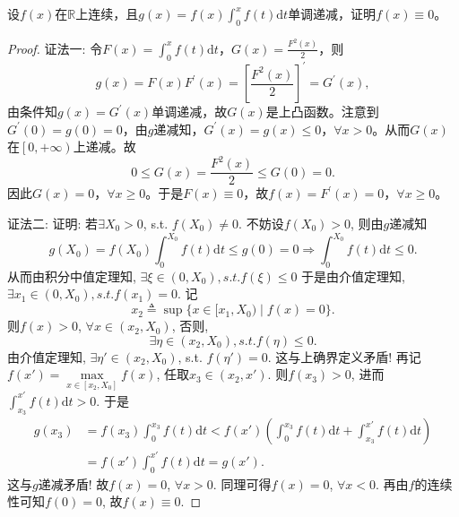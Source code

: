 \documentclass[../../main.tex]{subfiles}
\begin{document}
\begin{example}
设$f(x)$在$\mathbb{R}$上连续，且$g(x)=f(x)\int_0^x f(t)\mathrm{d}t$单调递减，证明$f(x)\equiv 0$。
\end{example}
\begin{proof}
{\color{blue}证法一:}
令$F\left( x \right) =\int_0^x{f\left( t \right) \mathrm{d}t}$，$G\left( x \right) =\frac{F^2\left( x \right)}{2}$，则
\[
g\left( x \right) =F\left( x \right) F^\prime \left( x \right) =\left[ \frac{F^2\left( x \right)}{2} \right] ^\prime =G^\prime \left( x \right),
\]
由条件知$g\left( x \right) =G^\prime \left( x \right)$单调递减，故$G\left( x \right)$是上凸函数。注意到$G^\prime \left( 0 \right) =g\left( 0 \right) =0$，由$g$递减知，$G^\prime \left( x \right) =g\left( x \right) \leqslant 0$，$\forall x>0$。从而$G\left( x \right)$在$\left[ 0,+\infty \right)$上递减。故
\[
0\leqslant G\left( x \right) =\frac{F^2\left( x \right)}{2}\leqslant G\left( 0 \right) =0.
\]
因此$G\left( x \right) =0$，$\forall x\geqslant 0$。于是$F\left( x \right) \equiv 0$，故$f\left( x \right) =F^\prime \left( x \right) =0$，$\forall x\geqslant 0$。

{\color{blue}证法二:}
证明: 若$\exists X_0>0$, s.t. $f(X_0)\neq 0$. 不妨设$f(X_0)>0$,
则由$g$递减知
$$g(X_0)=f(X_0)\int_0^{X_0} f(t)\mathrm{d}t \leqslant g(0)=0 \Rightarrow \int_0^{X_0} f(t)\mathrm{d}t \leqslant 0.$$
从而由积分中值定理知, $\exists \xi \in (0,X_0), s.t. f(\xi) \leqslant 0$
于是由介值定理知, $\exists x_1 \in (0,X_0), s.t. f(x_1)=0.$
记
$$x_2 \triangleq \sup\{x \in [x_1,X_0) \mid f(x)=0\}.$$
则$f(x)>0$, $\forall x \in (x_2,X_0)$, 否则, $$\exists \eta \in (x_2,X_0), s.t. f(\eta) \leqslant 0.$$
由介值定理知, $\exists \eta' \in (x_2,X_0)$, s.t. $f(\eta')=0$. 这与上确界定义矛盾! 再记
$f(x') = \max\limits_{x \in [x_2,X_0]} f(x)$,
任取$x_3 \in (x_2,x')$. 则$f(x_3)>0$, 进而$\int_{x_3}^{x'} f(t)\mathrm{d}t >0$. 于是
\begin{align*}
g(x_3) &= f(x_3)\int_0^{x_3} f(t)\mathrm{d}t < f(x')\left( \int_0^{x_3} f(t)\mathrm{d}t + \int_{x_3}^{x'} f(t)\mathrm{d}t \right)\\
&= f(x')\int_0^{x'} f(t)\mathrm{d}t = g(x').
\end{align*}
这与$g$递减矛盾! 故$f(x)=0$, $\forall x>0$. 同理可得$f(x)=0$, $\forall x<0$.
再由$f$的连续性可知$f(0)=0$, 故$f(x) \equiv 0$.


\end{proof}
\end{document}

